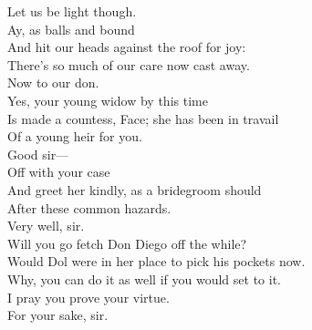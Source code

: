 \documentclass[a4paper,oneside,12pt]{memoir}
\begin{document}
\begin{drama*}
Let us be light though.\\
\subtlespeaks {}  Ay, as balls and bound\\
And hit our heads against the roof for joy:\\
There's so much of our care now cast away.\\
\facespeaks Now to our don.\\
\subtlespeaks {} Yes, your young widow by this time\\
Is made a countess, Face; she has been in travail\\
Of a young heir for you.\\
\facespeaks {} Good sir---\\
\subtlespeaks {} Off with your case\\
And greet her kindly, as a bridegroom should\\
After these common hazards.\\
\facespeaks {} Very well, sir.\\
Will you go fetch Don Diego off the while?\\
\subtlespeaks Would Dol were in her place to pick his pockets now.\\
\facespeaks Why, you can do it as well if you would set to it.\\
I pray you prove your virtue.\\
\subtlespeaks {} For your sake, sir.

\scene


\end{drama*}
\end{document}
